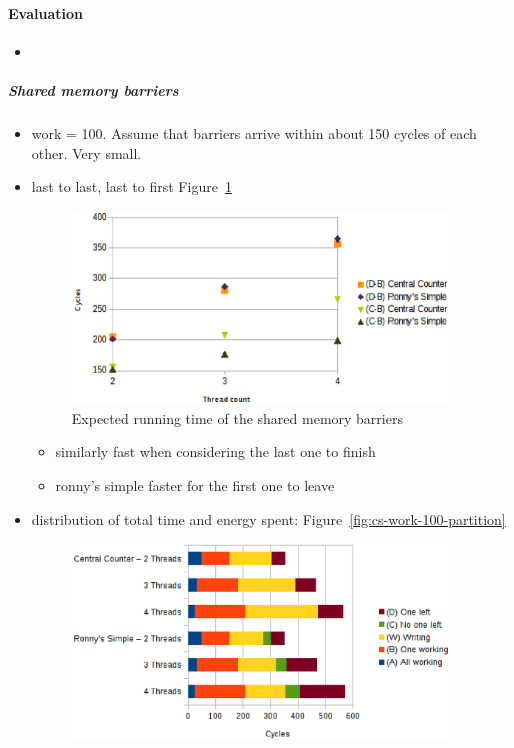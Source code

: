\documentclass[a4paper, 10pt]{article}
\begin{document}
\paragraph{Evaluation}
\label{ssssec:analysis-modelchecking-quantitative-properties-results}
\begin{itemize}
	\item 
\end{itemize}

\subparagraph{Shared memory barriers}
\label{sssssec:analysis-modelchecking-quantitative-properties-results-shared}
\begin{itemize}
	\item work = 100. Assume that barriers arrive within about 150 cycles of each other. Very small.
	\item last to last, last to first Figure~\ref{fig:cs-time-work-100-B-C-D}
		\begin{figure}[htbp]
			\centering
			\includegraphics[width=10cm]{charts/cs-time-work-100-B-C-D}
			\caption{Expected running time of the shared memory barriers}
			\label{fig:cs-time-work-100-B-C-D}
		\end{figure}
		\begin{itemize}
			\item similarly fast when considering the last one to finish
			\item ronny's simple faster for the first one to leave
		\end{itemize}
	\item distribution of total time and energy spent: Figure~\ref{fig:cs-work-100-partition}
		\begin{figure}[htbp]
			\centering
			\includegraphics[width=10cm]{charts/cs-time-work-100-partition}

\end{figure}
\end{itemize}
\end{document}
